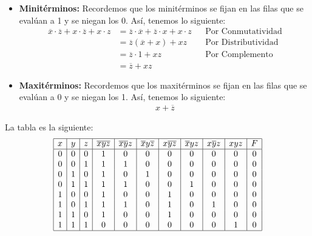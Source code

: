 \documentclass[answers]{exam}
\begin{document}
\begin{questions}
\begin{solution}
\begin{gather*}
\begin{array}{|c|c|c|c|}
      \end{array}
    \end{gather*}
    \begin{itemize}
      \item \textbf{Minitérminos:} Recordemos que los minitérminos se fijan en
            las filas que se evalúan a 1 y se niegan los 0. Así, tenemos lo
            siguiente:
      \begin{align*}
        \overline{x} \cdot \overline{z} + x \cdot \overline{z} + x \cdot z
        &= \overline{z} \cdot \overline{x} + \overline{z} \cdot x + x \cdot z
        &&\text{Por Conmutatividad}\\
        &= \overline{z}(\overline{x} + x) + xz &&\text{Por Distributividad}\\
        &= \overline{z} \cdot 1 + xz &&\text{Por Complemento}\\
        &= \overline{z} + xz
      \end{align*}
      \item \textbf{Maxitérminos:} Recordemos que los maxitérminos se fijan en
            las filas que se evalúan a 0 y se niegan los 1. Así, tenemos lo
            siguiente:
      \begin{align*}
        x + \overline{z}
      \end{align*}
    \end{itemize}

  \end{solution}

   \vspace{-2em}
  \begin{solution}
    La tabla es la siguiente:
    \begin{gather*}
      \begin{array}{|c|c|c|c|c|c|c|c|c|c|c|}
        \hline
        x & y & z & \overline{xyz} & \overline{xy}z & \overline{x}y\overline{z} &
        x\overline{yz} & \overline{x}yz & x\overline{y}z & xyz & F \\
        \hline
        0 & 0 & 0 & 1 & 0 & 0 & 0 & 0 & 0 & 0 & 0 \\
        0 & 0 & 1 & 1 & 1 & 0 & 0 & 0 & 0 & 0 & 0 \\
        0 & 1 & 0 & 1 & 0 & 1 & 0 & 0 & 0 & 0 & 0 \\
        0 & 1 & 1 & 1 & 1 & 0 & 0 & 1 & 0 & 0 & 0 \\
        1 & 0 & 0 & 1 & 0 & 0 & 1 & 0 & 0 & 0 & 0 \\
        1 & 0 & 1 & 1 & 1 & 0 & 1 & 0 & 1 & 0 & 0 \\
        1 & 1 & 0 & 1 & 0 & 0 & 1 & 0 & 0 & 0 & 0 \\
        1 & 1 & 1 & 0 & 0 & 0 & 0 & 0 & 0 & 1 & 0 \\
        \hline
      \end{array}
    \end{gather*}
  \end{solution}


\end{questions}
\end{document}
